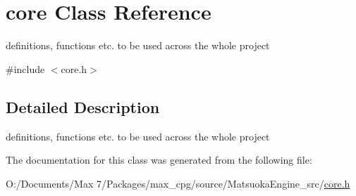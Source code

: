 \hypertarget{classcore}{}\section{core Class Reference}
\label{classcore}


definitions, functions etc. to be used across the whole project  




{\ttfamily \#include $<$core.\+h$>$}



\subsection{Detailed Description}
definitions, functions etc. to be used across the whole project 

The documentation for this class was generated from the following file\+:\begin{DoxyCompactItemize}
\item 
O\+:/\+Documents/\+Max 7/\+Packages/max\+\_\+cpg/source/\+Matsuoka\+Engine\+\_\+src/\mbox{\hyperlink{core_8h}{core.\+h}}\end{DoxyCompactItemize}
